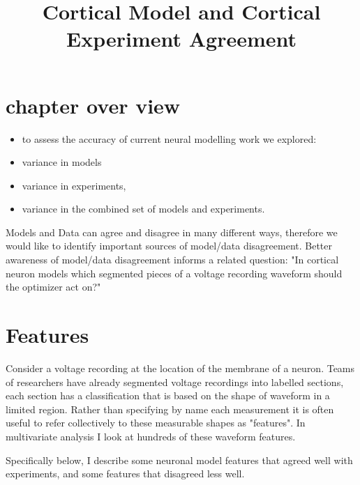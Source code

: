 
\section{chapter over view}
\begin{itemize}

\item to assess the accuracy of current neural modelling work we explored:
\item variance in models
\item variance in experiments,  
\item variance in the combined set of models and experiments.


\end{itemize}


\title{Cortical Model and Cortical Experiment Agreement}
Models and Data can agree and disagree in many different ways, therefore we would like to identify important sources of model/data disagreement. Better awareness of model/data disagreement informs a related question: "In  cortical neuron models which segmented pieces of a voltage recording waveform should the optimizer act on?"

\section{Features} Consider a voltage recording at the location of the membrane of a neuron. Teams of researchers have already segmented voltage recordings into labelled sections, each section has a classification that is based on the shape of waveform in a limited region. Rather than specifying by name each measurement it is often useful to refer collectively to these measurable shapes as "features". In multivariate analysis I look at hundreds of these waveform features. 

Specifically below, I describe some neuronal model features that agreed well with experiments, and some features that disagreed less well.


